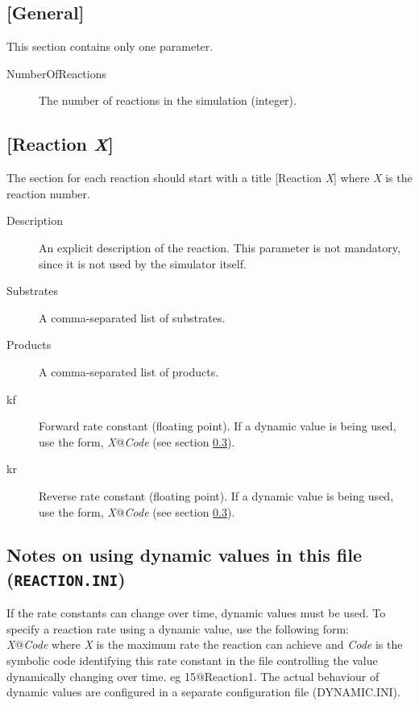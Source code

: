\subsection{[General]}
This section contains only one parameter.

\begin{description}
\item[NumberOfReactions] The number of reactions in the simulation
(integer).
\end{description}

\subsection{[Reaction \emph{X}]}
The section for each reaction should start with a title [Reaction
\emph{X}] where \emph{X} is the reaction number.
\begin{description}
\item[Description] An explicit description of the reaction. This
  parameter is not mandatory, since it is not used by the \stochsim{}
  simulator itself.

\item[Substrates] A comma-separated list of substrates.

\item[Products] A comma-separated list of products.
  
\item[kf] Forward rate constant (floating point). If a dynamic value
  is being used, use the form, \emph{X}@\emph{Code} (see section
  \ref{r_dv_notes}).
  
\item[kr] Reverse rate constant (floating point). If a dynamic value
  is being used, use the form, \emph{X}@\emph{Code} (see section
  \ref{r_dv_notes}).
\end{description}

\subsection{Notes on using dynamic values in this file (\texttt{REACTION.INI})}
\label{r_dv_notes}
If the rate constants can change over time, dynamic values must be
used.  To specify a reaction rate using a dynamic value, use the
following form:\\[\baselineskip]
\emph{X}@\emph{Code} where \emph{X} is the maximum rate the reaction
can achieve and \emph{Code} is the symbolic code identifying this rate
constant in the file controlling the value dynamically changing over
time. eg 15@Reaction1.  The actual behaviour of dynamic values are
configured in a separate configuration file (DYNAMIC.INI).


